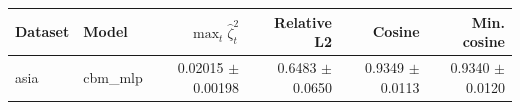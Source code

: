 \begin{tabular}{llrrrr}
\toprule
Dataset & Model & $\max_t \widehat{\zeta}_t^2$ & Relative L2 & Cosine & Min. cosine \\
\midrule
asia & cbm\_mlp & 0.02015 $\pm$ 0.00198 & 0.6483 $\pm$ 0.0650 & 0.9349 $\pm$ 0.0113 & 0.9340 $\pm$ 0.0120 \\
\bottomrule
\end{tabular}
